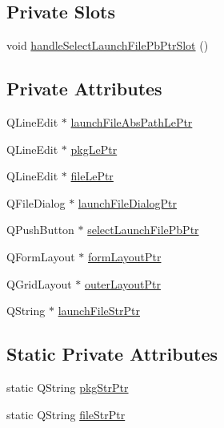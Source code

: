 \subsection*{Private Slots}
\begin{DoxyCompactItemize}
\item 
void \hyperlink{class_run_page__2_a2fd4cbef5d6bff41e036538830893d84}{handle\-Select\-Launch\-File\-Pb\-Ptr\-Slot} ()
\end{DoxyCompactItemize}
\subsection*{Private Attributes}
\begin{DoxyCompactItemize}
\item 
Q\-Line\-Edit $\ast$ \hyperlink{class_run_page__2_a7478e3f884c84a636a547dba64abd2ca}{launch\-File\-Abs\-Path\-Le\-Ptr}
\item 
Q\-Line\-Edit $\ast$ \hyperlink{class_run_page__2_a4e18de84e7946a126f05c2d2a46e3d60}{pkg\-Le\-Ptr}
\item 
Q\-Line\-Edit $\ast$ \hyperlink{class_run_page__2_adbe7177a28276ed683f9721e64974a9d}{file\-Le\-Ptr}
\item 
Q\-File\-Dialog $\ast$ \hyperlink{class_run_page__2_aa3d8cc41a4674ec8ddd7c9ee694b5121}{launch\-File\-Dialog\-Ptr}
\item 
Q\-Push\-Button $\ast$ \hyperlink{class_run_page__2_a63aea1b3e5cb510e54893adc80bd4852}{select\-Launch\-File\-Pb\-Ptr}
\item 
Q\-Form\-Layout $\ast$ \hyperlink{class_run_page__2_a2a3b5601031396ce15de633630385e61}{form\-Layout\-Ptr}
\item 
Q\-Grid\-Layout $\ast$ \hyperlink{class_run_page__2_a0f6d8544357260968d9244cd6f927656}{outer\-Layout\-Ptr}
\item 
Q\-String $\ast$ \hyperlink{class_run_page__2_a2f0a31e8ef388e15091c88a904d77618}{launch\-File\-Str\-Ptr}
\end{DoxyCompactItemize}
\subsection*{Static Private Attributes}
\begin{DoxyCompactItemize}
\item 
static Q\-String \hyperlink{class_run_page__2_a3cb53dcb4a7355f093c49485c0e72b6c}{pkg\-Str\-Ptr}
\item 
static Q\-String \hyperlink{class_run_page__2_a38819f2c591cbab6a3ab8d52d9d3c2c3}{file\-Str\-Ptr}
\end{DoxyCompactItemize}


